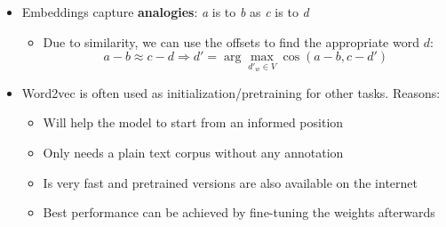 \begin{itemize}
\begin{itemize}
	\end{itemize}
	\item Embeddings capture \textbf{analogies}: \textit{a} is to \textit{b} as \textit{c} is to \textit{d}
	\begin{itemize}
		\item Due to similarity, we can use the offsets to find the appropriate word $d$:
		$$a-b\approx c-d \Rightarrow d' = \arg\max_{d'_w \in V} \cos\left(a-b, c-d'\right)$$
	\end{itemize}
	\item Word2vec is often used as initialization/pretraining for other tasks. Reasons:
	\begin{itemize}
		\item Will help the model to start from an informed position
		\item Only needs a plain text corpus without any annotation
		\item Is very fast and pretrained versions are also available on the internet
		\item Best performance can be achieved by fine-tuning the weights afterwards
	\end{itemize}
\end{itemize}